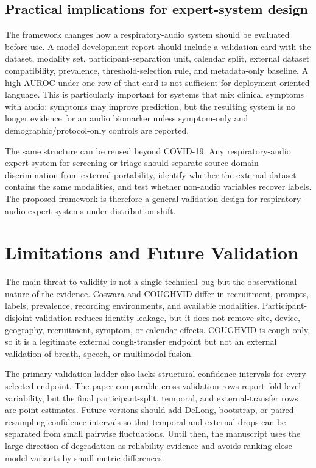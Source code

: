 \documentclass[preprint,12pt]{elsarticle}
\begin{document}
\subsection{Practical implications for expert-system design}

The framework changes how a respiratory-audio system should be evaluated before use. A model-development report should include a validation card with the dataset, modality set, participant-separation unit, calendar split, external dataset compatibility, prevalence, threshold-selection rule, and metadata-only baseline. A high AUROC under one row of that card is not sufficient for deployment-oriented language. This is particularly important for systems that mix clinical symptoms with audio: symptoms may improve prediction, but the resulting system is no longer evidence for an audio biomarker unless symptom-only and demographic/protocol-only controls are reported.

The same structure can be reused beyond COVID-19. Any respiratory-audio expert system for screening or triage should separate source-domain discrimination from external portability, identify whether the external dataset contains the same modalities, and test whether non-audio variables recover labels. The proposed framework is therefore a general validation design for respiratory-audio expert systems under distribution shift.

\section{Limitations and Future Validation}

The main threat to validity is not a single technical bug but the observational nature of the evidence. Coswara and COUGHVID differ in recruitment, prompts, labels, prevalence, recording environments, and available modalities. Participant-disjoint validation reduces identity leakage, but it does not remove site, device, geography, recruitment, symptom, or calendar effects. COUGHVID is cough-only, so it is a legitimate external cough-transfer endpoint but not an external validation of breath, speech, or multimodal fusion.

The primary validation ladder also lacks structural confidence intervals for every selected endpoint. The paper-comparable cross-validation rows report fold-level variability, but the final participant-split, temporal, and external-transfer rows are point estimates. Future versions should add DeLong, bootstrap, or paired-resampling confidence intervals so that temporal and external drops can be separated from small pairwise fluctuations. Until then, the manuscript uses the large direction of degradation as reliability evidence and avoids ranking close model variants by small metric differences.
\end{document}
